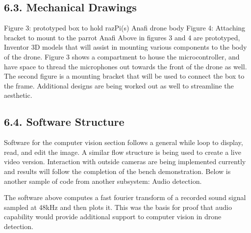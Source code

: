 \documentclass[10pt]{article}
\begin{document}
\subsection{6.3. Mechanical Drawings}

           
Figure 3: prototyped box to hold razPi(s) Anafi drone body           Figure 4: Attaching bracket to mount to the parrot Anafi
Above in figures 3 and 4 are prototyped, Inventor 3D models that will assist in mounting various components to the body of the drone. Figure 3 shows a compartment to house the microcontroller, and have space to thread the microphones out towards the front of the drone as well. The second figure is a mounting bracket that will be used to connect the box to the frame. Additional designs are being worked out as well to streamline the aesthetic. 

\subsection{6.4. Software Structure}
%
Software for the computer vision section follows a general while loop to display, read, and edit the image. A similar flow structure is being used to create a live video version. Interaction with outside cameras are being implemented currently and results will follow the completion of the bench demonstration. Below is another sample of code from another subsystem: Audio detection. 
%



The software above computes a fast fourier transform of a recorded sound signal sampled at 48kHz and then plots it. This was the basis for proof that audio capability would provide additional support to computer vision in drone detection.
\end{document}
